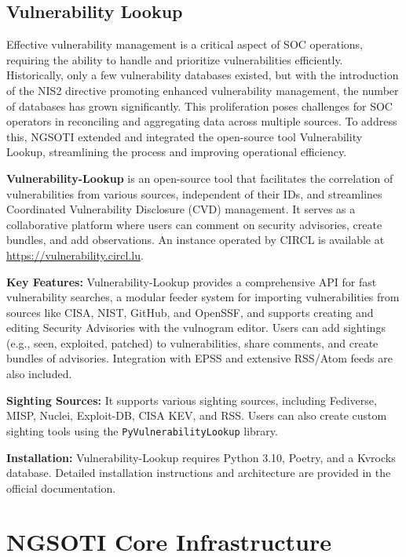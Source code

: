 \subsection{Vulnerability Lookup}
Effective vulnerability management is a critical aspect of SOC operations,
requiring the ability to handle and prioritize vulnerabilities efficiently.
Historically, only a few vulnerability databases existed, but with the
introduction of the NIS2 directive promoting enhanced vulnerability management,
the number of databases has grown significantly. This proliferation poses
challenges for SOC operators in reconciling and aggregating data across
multiple sources. To address this, NGSOTI extended and integrated the
open-source tool Vulnerability Lookup\cite{vulnerability_lookup},
streamlining the process and improving operational efficiency.

\textbf{Vulnerability-Lookup} is an open-source tool that facilitates the correlation 
of vulnerabilities from various sources, independent of their IDs, and streamlines 
Coordinated Vulnerability Disclosure (CVD) management. It serves as a collaborative 
platform where users can comment on security advisories, create bundles, and add 
observations. An instance operated by CIRCL is available at 
\url{https://vulnerability.circl.lu}.

\textbf{Key Features:}
Vulnerability-Lookup provides a comprehensive API for fast vulnerability searches, 
a modular feeder system for importing vulnerabilities from sources like CISA, NIST, 
GitHub, and OpenSSF, and supports creating and editing Security Advisories with the 
vulnogram editor. Users can add sightings (e.g., seen, exploited, patched) to 
vulnerabilities, share comments, and create bundles of advisories. Integration with 
EPSS and extensive RSS/Atom feeds are also included.

\textbf{Sighting Sources:}
It supports various sighting sources, including Fediverse, MISP, Nuclei, Exploit-DB, 
CISA KEV, and RSS. Users can also create custom sighting tools using the 
\texttt{PyVulnerabilityLookup} library.

\textbf{Installation:}
Vulnerability-Lookup requires Python 3.10, Poetry, and a Kvrocks database. Detailed 
installation instructions and architecture are provided in the official documentation.


\section{NGSOTI Core Infrastructure}

